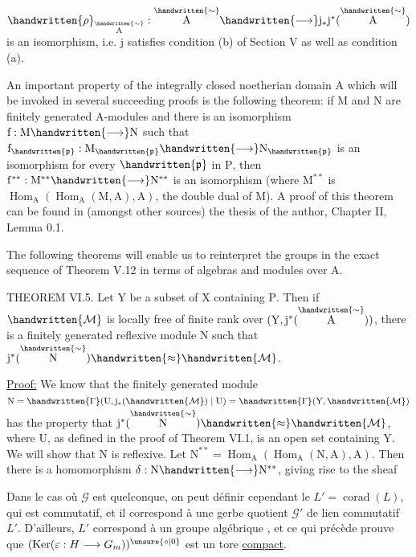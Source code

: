 $\mathrm{\handwritten{\rho}_{\overset{\handwritten{\sim}}{A}}:\overset{\handwritten{\sim}}{A} \handwritten{\longrightarrow} j_*j^*(\overset{\handwritten{\sim}}{A})}$ is an isomorphism, i.e. $\mathrm{j}$ satisfies condition (b)
of Section V as well as condition (a).

An important property of the integrally closed noetherian domain
$\mathrm{A}$ which will be invoked in several succeeding proofs is the following
theorem: if $\mathrm{M}$ and $\mathrm{N}$ are finitely generated $\mathrm{A}$-modules and there
is an isomorphism $\mathrm{f:M \handwritten{\longrightarrow} N}$ such that $\mathrm{f_{\handwritten{\mathfrak p}}:M_{\handwritten{\mathfrak p}} \handwritten{\longrightarrow} N_{\handwritten{\mathfrak p}}}$ is an
isomorphism for every $\mathrm{\handwritten{\mathfrak p}}$ in $\mathrm{P}$, then $\mathrm{f^{**}:M^{**} \handwritten{\longrightarrow} N^{**}}$ is an
isomorphism (where $\mathrm{M^{**}}$ is $\mathrm{\operatorname{Hom}_A(\operatorname{Hom}_A(M,A),A)}$, the double
dual of $\mathrm{M}$). A proof of this theorem can be found in (amongst other
sources) the thesis of the author, Chapter II, Lemma 0.1.

The following theorems will enable us to reinterpret the groups in
the exact sequence of Theorem V.12 in terms of algebras and modules
over $\mathrm{A}$.

THEOREM VI.5. Let $\mathrm{Y}$ be a subset of $\mathrm{X}$ containing $\mathrm{P}$.
Then if $\mathrm{\handwritten{\mathcal M}}$ is locally free of finite rank over $\mathrm{(Y,j^*(\overset{\handwritten{\sim}}{A}))}$, there is a
finitely generated reflexive module $\mathrm{N}$ such that $\mathrm{j^*(\overset{\handwritten{\sim}}{N}) \handwritten{\approx} \handwritten{\mathcal M}}$.

\uline{Proof:} We know that the finitely generated module
$\mathrm{N=\handwritten{\Gamma}(U,j_*(\handwritten{\mathcal M})\mid U)=\handwritten{\Gamma}(Y,\handwritten{\mathcal M})}$ has the property that $\mathrm{j^*(\overset{\handwritten{\sim}}{N}) \handwritten{\approx} \handwritten{\mathcal M}}$, where
$\mathrm{U}$, as defined in the proof of Theorem VI.1, is an open set containing
$\mathrm{Y}$. We will show that $\mathrm{N}$ is reflexive. Let $\mathrm{N^{**}=\operatorname{Hom}_A(\operatorname{Hom}_A(N,A),A)}$.
Then there is a homomorphism $\mathrm{\delta:N \handwritten{\longrightarrow} N^{**}}$, giving rise to the sheaf

Dans le cas où $\mathscr G$ est quelconque, on peut
définir cependant le  $L'=\operatorname{corad}(L)$, qui est
commutatif, et il correspond à une
gerbe quotient $\mathscr G'$ de lien commutatif $L'$.
D'ailleurs, $L'$ correspond à un groupe
algébrique , et ce qui précède prouve que
$(\operatorname{Ker}(\varepsilon:H\longrightarrow{}G_m))^{\unsure{\circ|0}}$ est un tore \uline{compact}.

